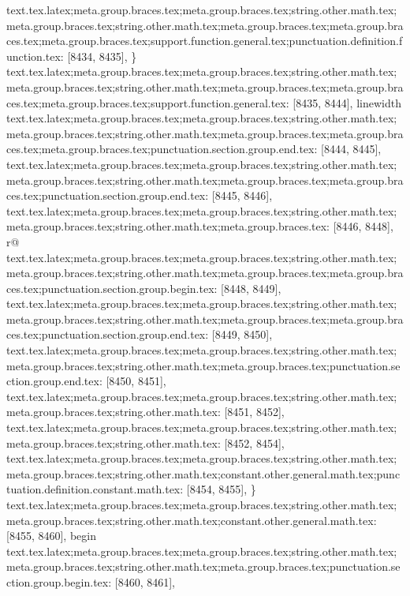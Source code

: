 {{{{{{{{{{{{{{{{{{{{{{{{{{{{{{{{{{{{{{{{{{{{{{{{{{{{{{{{{{{{{{{{{{{{{{{{{{{{{{{{{{{{{{{{{{{{{{{{{{{{{{{{{{{{{{{{{{{{{{{{{{{{{{{{{{{{{{{{{{{{{{{{{{{{{{{{{{{{{{{{{{{{{{{{{{{{{{{{{{{{{{{{{{{{{{{{{{{{{{{{{{{{{{{{{{{{{{{{{{{{{{{{{{{{{{{{{{{{{{{{{{{{{{{{{{{text.tex.latex;meta.group.braces.tex;meta.group.braces.tex;string.other.math.tex;meta.group.braces.tex;string.other.math.tex;meta.group.braces.tex;meta.group.braces.tex;meta.group.braces.tex;support.function.general.tex;punctuation.definition.function.tex: [8434, 8435], {\}
text.tex.latex;meta.group.braces.tex;meta.group.braces.tex;string.other.math.tex;meta.group.braces.tex;string.other.math.tex;meta.group.braces.tex;meta.group.braces.tex;meta.group.braces.tex;support.function.general.tex: [8435, 8444], {linewidth}
text.tex.latex;meta.group.braces.tex;meta.group.braces.tex;string.other.math.tex;meta.group.braces.tex;string.other.math.tex;meta.group.braces.tex;meta.group.braces.tex;meta.group.braces.tex;punctuation.section.group.end.tex: [8444, 8445], {}}
text.tex.latex;meta.group.braces.tex;meta.group.braces.tex;string.other.math.tex;meta.group.braces.tex;string.other.math.tex;meta.group.braces.tex;meta.group.braces.tex;punctuation.section.group.end.tex: [8445, 8446], {}}
text.tex.latex;meta.group.braces.tex;meta.group.braces.tex;string.other.math.tex;meta.group.braces.tex;string.other.math.tex;meta.group.braces.tex: [8446, 8448], {r@}
text.tex.latex;meta.group.braces.tex;meta.group.braces.tex;string.other.math.tex;meta.group.braces.tex;string.other.math.tex;meta.group.braces.tex;meta.group.braces.tex;punctuation.section.group.begin.tex: [8448, 8449], {{}
text.tex.latex;meta.group.braces.tex;meta.group.braces.tex;string.other.math.tex;meta.group.braces.tex;string.other.math.tex;meta.group.braces.tex;meta.group.braces.tex;punctuation.section.group.end.tex: [8449, 8450], {}}
text.tex.latex;meta.group.braces.tex;meta.group.braces.tex;string.other.math.tex;meta.group.braces.tex;string.other.math.tex;meta.group.braces.tex;punctuation.section.group.end.tex: [8450, 8451], {}}
text.tex.latex;meta.group.braces.tex;meta.group.braces.tex;string.other.math.tex;meta.group.braces.tex;string.other.math.tex: [8451, 8452], {
}
text.tex.latex;meta.group.braces.tex;meta.group.braces.tex;string.other.math.tex;meta.group.braces.tex;string.other.math.tex: [8452, 8454], {  }
text.tex.latex;meta.group.braces.tex;meta.group.braces.tex;string.other.math.tex;meta.group.braces.tex;string.other.math.tex;constant.other.general.math.tex;punctuation.definition.constant.math.tex: [8454, 8455], {\}
text.tex.latex;meta.group.braces.tex;meta.group.braces.tex;string.other.math.tex;meta.group.braces.tex;string.other.math.tex;constant.other.general.math.tex: [8455, 8460], {begin}
text.tex.latex;meta.group.braces.tex;meta.group.braces.tex;string.other.math.tex;meta.group.braces.tex;string.other.math.tex;meta.group.braces.tex;punctuation.section.group.begin.tex: [8460, 8461], {{}
}}}}}}}}}}}}}}}}}}}}}}}}}}}}}}}}}}}}}}}}}}}}}}}}}}}}}}}}}}}}}}}}}}}}}}}}}}}}}}}}}}}}}}}}}}}}}}}}}}}}}}}}}}}}}}}}}}}}}}}}}}}}}}}}}}}}}}}}}}}}}}}}}}}}}}}}}}}}}}}}}}}}}}}}}}}}}}}}}}}}}}}}}}}}}}}}}}}}}}}}}}}}}}}}}}}}}}}}}}}}}}}}}}}}}}}}}}}}}}}}}}}}}}}}}}}
